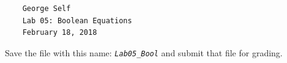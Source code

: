 \bigskip
\begin{minipage}{\linewidth}
	\begin{verbatim}
	George Self
	Lab 05: Boolean Equations
	February 18, 2018
	\end{verbatim}
\end{minipage}
\bigskip

Save the file with this name: \emph{\texttt{Lab05\_Bool}} and submit that file for grading.

